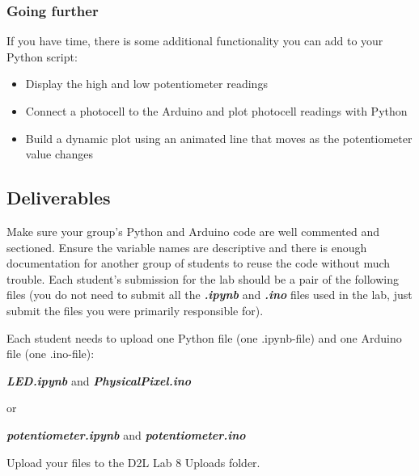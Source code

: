     \hypertarget{going-further}{%
\subsubsection{Going further}\label{going-further}}

If you have time, there is some additional functionality you can add to
your Python script:

\begin{itemize}
\item
  Display the high and low potentiometer readings
\item
  Connect a photocell to the Arduino and plot photocell readings with
  Python
\item
  Build a dynamic plot using an animated line that moves as the
  potentiometer value changes
\end{itemize}

    \hypertarget{deliverables}{%
\subsection{Deliverables}\label{deliverables}}

Make sure your group's Python and Arduino code are well commented and
sectioned. Ensure the variable names are descriptive and there is enough
documentation for another group of students to reuse the code without
much trouble. Each student's submission for the lab should be a pair of the
following files (you do not need to submit all the
\textbf{\emph{.ipynb}} and \textbf{\emph{.ino}} files used in the lab,
just submit the files you were primarily responsible for).

Each student needs to upload one Python file (one .ipynb-file) and one
Arduino file (one .ino-file):

\textbf{\emph{LED.ipynb}} and \textbf{\emph{PhysicalPixel.ino}}

or

\textbf{\emph{potentiometer.ipynb}} and
\textbf{\emph{potentiometer.ino}}

Upload your files to the D2L Lab 8 Uploads
folder.
    
    
    
    
